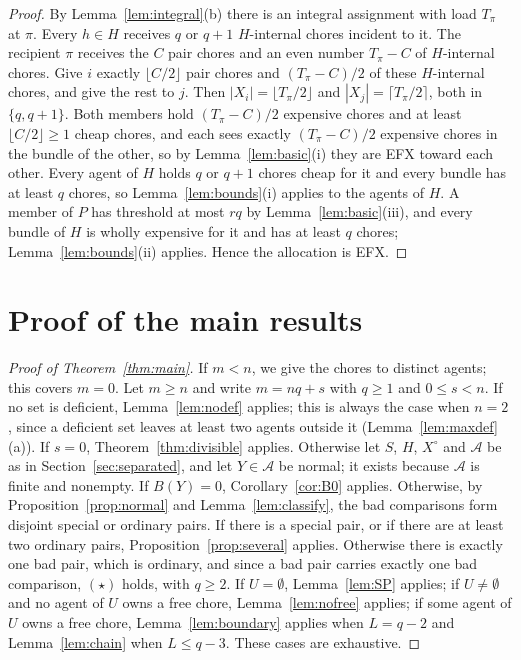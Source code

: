 \documentclass{amsart}
\numberwithin{equation}{section}
\theoremstyle{definition}
\theoremstyle{remark}
\newcommand{\cA}{\mathcal{A}}
\begin{document}
\begin{proof}
By Lemma~\ref{lem:integral}(b) there is an integral assignment with load $T_\pi$ at $\pi$. Every $h\in H$ receives $q$ or $q+1$ $H$-internal chores incident to it. The recipient $\pi$ receives the $C$ pair chores and an even number $T_\pi-C$ of $H$-internal chores. Give $i$ exactly $\lfloor C/2\rfloor$ pair chores and $(T_\pi-C)/2$ of these $H$-internal chores, and give the rest to $j$. Then $|X_i|=\lfloor T_\pi/2\rfloor$ and $|X_j|=\lceil T_\pi/2\rceil$, both in $\{q,q+1\}$. Both members hold $(T_\pi-C)/2$ expensive chores and at least $\lfloor C/2\rfloor\ge1$ cheap chores, and each sees exactly $(T_\pi-C)/2$ expensive chores in the bundle of the other, so by Lemma~\ref{lem:basic}(i) they are EFX toward each other. Every agent of $H$ holds $q$ or $q+1$ chores cheap for it and every bundle has at least $q$ chores, so Lemma~\ref{lem:bounds}(i) applies to the agents of $H$. A member of $P$ has threshold at most $rq$ by Lemma~\ref{lem:basic}(iii), and every bundle of $H$ is wholly expensive for it and has at least $q$ chores; Lemma~\ref{lem:bounds}(ii) applies. Hence the allocation is EFX.
\end{proof}

\section{Proof of the main results}\label{sec:proof}

\begin{proof}[Proof of Theorem~\ref{thm:main}]
If $m<n$, we give the chores to distinct agents; this covers $m=0$. Let $m\ge n$ and write $m=nq+s$ with $q\ge1$ and $0\le s<n$. If no set is deficient, Lemma~\ref{lem:nodef} applies; this is always the case when $n=2$, since a deficient set leaves at least two agents outside it (Lemma~\ref{lem:maxdef}(a)). If $s=0$, Theorem~\ref{thm:divisible} applies. Otherwise let $S$, $H$, $X^\circ$ and $\cA$ be as in Section~\ref{sec:separated}, and let $Y\in\cA$ be normal; it exists because $\cA$ is finite and nonempty. If $B(Y)=0$, Corollary~\ref{cor:B0} applies. Otherwise, by Proposition~\ref{prop:normal} and Lemma~\ref{lem:classify}, the bad comparisons form disjoint special or ordinary pairs. If there is a special pair, or if there are at least two ordinary pairs, Proposition~\ref{prop:several} applies. Otherwise there is exactly one bad pair, which is ordinary, and since a bad pair carries exactly one bad comparison, $(\star)$ holds, with $q\ge2$. If $U=\emptyset$, Lemma~\ref{lem:SP} applies; if $U\ne\emptyset$ and no agent of $U$ owns a free chore, Lemma~\ref{lem:nofree} applies; if some agent of $U$ owns a free chore, Lemma~\ref{lem:boundary} applies when $L=q-2$ and Lemma~\ref{lem:chain} when $L\le q-3$. These cases are exhaustive.
\end{proof}
\end{document}
